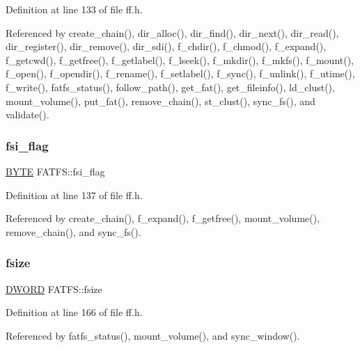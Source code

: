 Definition at line 133 of file ff.\+h.



Referenced by create\+\_\+chain(), dir\+\_\+alloc(), dir\+\_\+find(), dir\+\_\+next(), dir\+\_\+read(), dir\+\_\+register(), dir\+\_\+remove(), dir\+\_\+sdi(), f\+\_\+chdir(), f\+\_\+chmod(), f\+\_\+expand(), f\+\_\+getcwd(), f\+\_\+getfree(), f\+\_\+getlabel(), f\+\_\+lseek(), f\+\_\+mkdir(), f\+\_\+mkfs(), f\+\_\+mount(), f\+\_\+open(), f\+\_\+opendir(), f\+\_\+rename(), f\+\_\+setlabel(), f\+\_\+sync(), f\+\_\+unlink(), f\+\_\+utime(), f\+\_\+write(), fatfs\+\_\+status(), follow\+\_\+path(), get\+\_\+fat(), get\+\_\+fileinfo(), ld\+\_\+clust(), mount\+\_\+volume(), put\+\_\+fat(), remove\+\_\+chain(), st\+\_\+clust(), sync\+\_\+fs(), and validate().

\mbox{\label{structFATFS_a84e9cdc5a6a8e33ea7ec192058abf161}} 
\subsubsection{\texorpdfstring{fsi\+\_\+flag}{fsi\_flag}}
{\footnotesize\ttfamily \hyperlink{ff_8h_a4ae1dab0fb4b072a66584546209e7d58}{B\+Y\+TE} F\+A\+T\+F\+S\+::fsi\+\_\+flag}



Definition at line 137 of file ff.\+h.



Referenced by create\+\_\+chain(), f\+\_\+expand(), f\+\_\+getfree(), mount\+\_\+volume(), remove\+\_\+chain(), and sync\+\_\+fs().

\mbox{\label{structFATFS_a53e9560659f14e66f306c2c444198bf3}} 
\subsubsection{\texorpdfstring{fsize}{fsize}}
{\footnotesize\ttfamily \hyperlink{ff_8h_ad342ac907eb044443153a22f964bf0af}{D\+W\+O\+RD} F\+A\+T\+F\+S\+::fsize}



Definition at line 166 of file ff.\+h.



Referenced by fatfs\+\_\+status(), mount\+\_\+volume(), and sync\+\_\+window().

